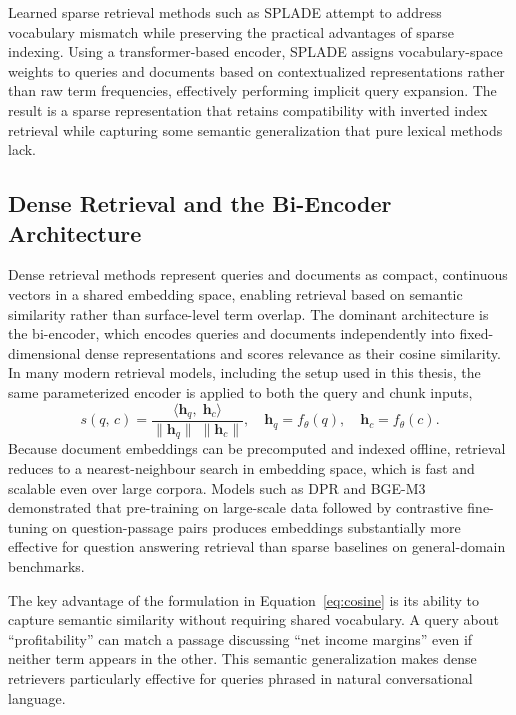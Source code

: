 \documentclass[12pt,twoside,maitrise]{dms}
\theoremstyle{definition}
\numberwithin{equation}{section}
\numberwithin{table}{chapter}
\numberwithin{figure}{chapter}
\begin{document}
Learned sparse retrieval methods such as SPLADE \citep{formal2021splade} attempt to
address vocabulary mismatch while preserving the practical advantages of sparse
indexing. Using a transformer-based encoder, SPLADE assigns vocabulary-space weights to
queries and documents based on contextualized representations rather than raw term
frequencies, effectively performing implicit query expansion. The result is a sparse
representation that retains compatibility with inverted index retrieval while capturing
some semantic generalization that pure lexical methods lack.

\subsection{Dense Retrieval and the Bi-Encoder Architecture}

Dense retrieval methods represent queries and documents as compact, continuous vectors
in a shared embedding space, enabling retrieval based on semantic similarity rather than
surface-level term overlap. The dominant architecture is the bi-encoder, which encodes
queries and documents independently into fixed-dimensional dense representations and
scores relevance as their cosine similarity. In many modern retrieval models, including
the setup used in this thesis, the same parameterized encoder is applied
to both the query and chunk inputs,
\begin{equation}
  s(q,\, c) = \frac{\langle \mathbf{h}_q,\; \mathbf{h}_c \rangle}
                   {\|\mathbf{h}_q\|\;\|\mathbf{h}_c\|},
  \quad
  \mathbf{h}_q = f_\theta(q),
  \quad
  \mathbf{h}_c = f_\theta(c).
  \label{eq:cosine}
\end{equation}
Because document embeddings can be precomputed and indexed offline, retrieval reduces to
a nearest-neighbour search in embedding space, which is fast and scalable even over large
corpora. Models such as DPR \citep{karpukhin2020dense} and BGE-M3 \citep{chen2024bge}
demonstrated that pre-training on large-scale data followed by contrastive fine-tuning
on question-passage pairs produces embeddings substantially more effective for question
answering retrieval than sparse baselines on general-domain benchmarks.

The key advantage of the formulation in Equation~\eqref{eq:cosine} is its ability to
capture semantic similarity without requiring shared vocabulary. A query about
``profitability'' can match a passage discussing ``net income margins'' even if neither
term appears in the other. This semantic generalization makes dense retrievers
particularly effective for queries phrased in natural conversational language.
\end{document}

